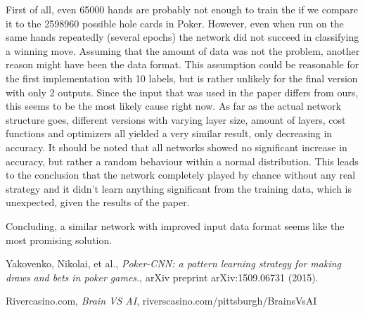 \documentclass[]{report}
\begin{document}
First of all, even 65000 hands are probably not enough to train the if we compare it to the 2598960 possible hole cards in Poker. However, even when run on the same hands repeatedly (several epochs) the network did not succeed in classifying a winning move. Assuming that the amount of data was not the problem, another reason might have been the data format. This assumption could be reasonable for the first implementation with 10 labels, but is rather unlikely for the final version with only 2 outputs. Since the input that was used in the paper differs from ours, this seems to be the most likely cause right now. As far as the actual network structure goes, different versions with varying layer size, amount of layers, cost functions and optimizers all yielded a very similar result, only decreasing in accuracy. It should be noted that all networks showed no significant increase in accuracy, but rather a random behaviour within a normal distribution. This leads to the conclusion that the network completely played by chance without any real strategy and it didn't learn anything significant from the training data, which is unexpected, given the results of the paper. 

Concluding, a similar network with improved input data format seems like the most promising solution.

\begin{thebibliography}{}
	 Yakovenko, Nikolai, et al., \emph{Poker-CNN: a pattern learning strategy for making draws and bets in poker games.}, arXiv preprint arXiv:1509.06731 (2015).
	
	 Rivercasino.com, \emph{Brain VS AI},
	riverscasino.com/pittsburgh/BrainsVsAI

\end{thebibliography}  
\end{document}

